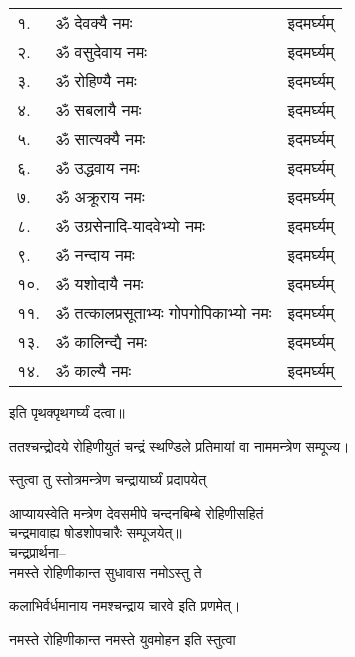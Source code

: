 \begin{center}
\begin{longtable}{ll@{—}l}
१.& ॐ देवक्यै नमः & इदमर्घ्यम्\\
२.& ॐ वसुदेवाय नमः & इदमर्घ्यम्\\
३.& ॐ रोहिण्यै नमः & इदमर्घ्यम्	\\
४.& ॐ सबलायै नमः & इदमर्घ्यम्	\\
५.& ॐ सात्यक्यै नमः & इदमर्घ्यम्\\
६.& ॐ उद्धवाय नमः & इदमर्घ्यम्	\\
७.& ॐ अक्रूराय नमः & इदमर्घ्यम्\\
८.& ॐ उग्रसेनादि-यादवेभ्यो नमः & इदमर्घ्यम्\\
९.& ॐ नन्दाय नमः & इदमर्घ्यम्\\
१०.& ॐ यशोदायै नमः & इदमर्घ्यम्	\\
११.& ॐ तत्कालप्रसूताभ्यः गोपगोपिकाभ्यो नमः & इदमर्घ्यम्\\
१३.& ॐ कालिन्द्यै नमः & इदमर्घ्यम्\\
१४.& ॐ काल्यै नमः & इदमर्घ्यम्\\

\end{longtable}

इति पृथक्पृथगर्घ्यं दत्वा॥\\
\medskip


ततश्चन्द्रोदये रोहिणीयुतं चन्द्रं स्थण्डिले प्रतिमायां वा नाममन्त्रेण सम्पूज्य।


{स्तुत्वा तु स्तोत्रमन्त्रेण चन्द्रायार्घ्यं प्रदापयेत्}
\medskip

आप्यायस्वेति मन्त्रेण देवसमीपे चन्दनबिम्बे रोहिणीसहितं\\
चन्द्रमावाह्य षोडशोपचारैः सम्पूजयेत्॥\\
चन्द्रप्रार्थना–\\




{नमस्ते रोहिणीकान्त सुधावास नमोऽस्तु ते}

{कलाभिर्वर्धमानाय नमश्चन्द्राय चारवे}
इति प्रणमेत्।

{नमस्ते रोहिणीकान्त नमस्ते युवमोहन}
इति स्तुत्वा\\
\medskip


\end{center}
